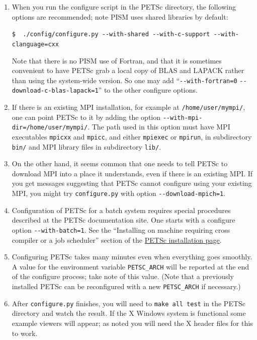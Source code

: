 \documentclass[11pt,final]{amsart}
\begin{document}
\begin{enumerate}
\begin{enumerate}
\item When you run the configure script in the PETSc directory, the following options are recommended; note PISM uses shared libraries by default:

\verb|$  ./config/configure.py --with-shared --with-c-support --with-clanguage=cxx|

Note that there is no PISM use of Fortran, and that it is sometimes convenient to have PETSc grab a local copy of BLAS and LAPACK rather than using the system-wide version.  So one may add ``\verb|--with-fortran=0| \verb|--download-c-blas-lapack=1|'' to the other configure options.

\item If there is an existing MPI installation, for example at \verb|/home/user/mympi/|, one can point PETSc to it by adding the option \verb|--with-mpi-dir=/home/user/mympi/|.  The path used in this option must have MPI executables \verb|mpicxx| and \verb|mpicc|, and either \verb|mpiexec| or \verb|mpirun|, in subdirectory \verb|bin/| and MPI library files in subdirectory \verb|lib/|.

\item On the other hand, it seems common that one needs to tell PETSc to download MPI into a place it understands, even if there is an existing MPI.  If you get messages suggesting that PETSc cannot configure using your existing MPI, you might try \verb|configure.py| with option \verb|--download-mpich=1|.

\item Configuration of PETSc for a batch system requires special procedures described at the PETSc documentation site.  One starts with a configure option \verb|--with-batch=1|.  See the ``Installing on machine requiring cross compiler or a job scheduler'' section of the \href{http://www-unix.mcs.anl.gov/petsc/petsc-2/documentation/installation.html}{PETSc installation page}.

\item  Configuring PETSc takes many minutes even when everything goes smoothly.   A value for the environment variable \verb|PETSC_ARCH| will be reported at the end of the configure process; take note of this value.  (Note that a previously installed PETSc can be reconfigured with a new \verb|PETSC_ARCH| if necessary.)

\item  After \verb|configure.py| finishes, you will need to \verb|make all test| in the PETSc directory and watch the result.  If the X Windows system is functional some example viewers will appear; as noted you will need the X header files for this to work.


\end{enumerate}
\end{enumerate}
\end{document}
